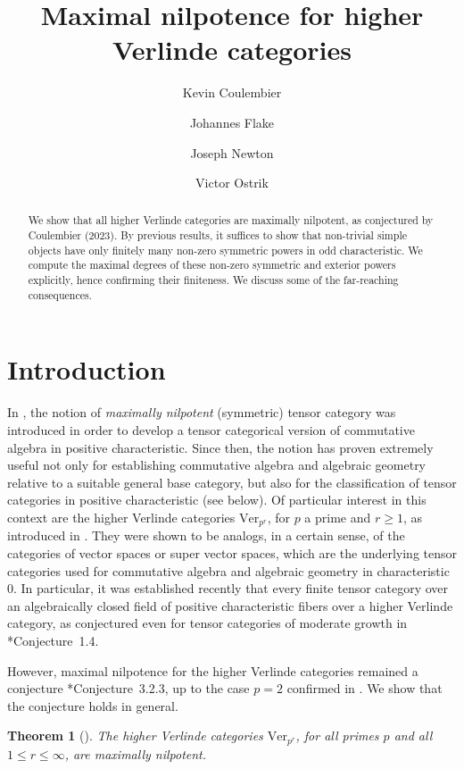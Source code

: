 \documentclass[11pt,oneside]{amsart}
\title{Maximal nilpotence for higher Verlinde categories}
\author{Kevin Coulembier}
\author{Johannes Flake}
\author{Joseph Newton}
\author{Victor Ostrik}
\newtheorem{introtheorem}{Theorem}
\theoremstyle{definition}
\theoremstyle{remark}
\numberwithin{equation}{section}
\newcommand\Ver{\mathrm{Ver}}
\renewcommand\:\colon
\begin{document}
\begin{abstract} We show that all higher Verlinde categories are maximally nilpotent, as conjectured by Coulembier (2023). By previous results, it suffices to show that non-trivial simple objects have only finitely many non-zero symmetric powers in odd characteristic. We compute the maximal degrees of these non-zero symmetric and exterior powers explicitly, hence confirming their finiteness. We discuss some of the far-reaching consequences.
\end{abstract}

\maketitle

\section{Introduction}

In \cite{Cou-commalg}, the notion of \emph{maximally nilpotent} (symmetric) tensor category was introduced in order to develop a tensor categorical version of commutative algebra in positive characteristic. Since then, the notion has proven extremely useful not only for establishing commutative algebra and algebraic geometry relative to a suitable general base category, but also for the classification of tensor categories in positive characteristic (see  below). Of particular interest in this context are the higher Verlinde categories $\Ver_{p^r}$, for $p$ a prime and $r\ge1$, as introduced in \cites{BEO,Cou-abelian}. They were shown to be analogs, in a certain sense, of the categories of vector spaces or super vector spaces, which are the underlying tensor categories used for commutative algebra and algebraic geometry in characteristic $0$. In particular, it was established recently \cite{CF-beo} that every finite tensor category over an algebraically closed field of positive characteristic fibers over a higher Verlinde category, as conjectured even for tensor categories of moderate growth in \cite{BEO}*{Conjecture~1.4}.

However, maximal nilpotence for the higher Verlinde categories remained a conjecture \cite{Cou-commalg}*{Conjecture~3.2.3}, up to the case $p=2$ confirmed in \cite{CEO-incompressible}. We show that the conjecture holds in general.

\begin{introtheorem}[] \label{thm:A} The higher Verlinde categories $\Ver_{p^r}$, for all primes $p$ and all $1\le r\le \infty$, are maximally nilpotent.
\end{introtheorem}
    
\end{document}
